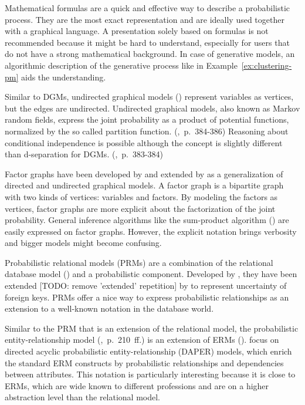 Mathematical formulas are a quick and effective way to describe a probabilistic process. They are the most exact representation and are ideally used together with a graphical language. A presentation solely based on formulas is not recommended because it might be hard to understand, especially for users that do not have a strong mathematical background. In case of generative models, an algorithmic description of the generative process like in Example~\ref{ex:clustering-pm} aids the understanding. 

Similar to DGMs, undirected graphical models (\cite{kindermann1980markov}) represent variables as vertices, but the edges are undirected. Undirected graphical models, also known as Markov random fields, express the joint probability as a product of potential functions, normalized by the so called partition function. (\cite{bishop2006pattern},~p.~384-386) Reasoning about conditional independence is possible although the concept is slightly different than d-separation for DGMs. (\cite{bishop2006pattern},~p.~383-384)

Factor graphs have been developed by \textcite{kschischang2001factor} and extended by \textcite{frey2002extending} as a generalization of directed and undirected graphical models. A factor graph is a bipartite graph with two kinds of vertices: variables and factors. By modeling the factors as vertices, factor graphs are more explicit about the factorization of the joint probability. General inference algorithms like the sum-product algorithm (\cite{pearl1988probabilistic}) are easily expressed on factor graphs. However, the explicit notation brings verbosity and bigger models might become confusing.

Probabilistic relational models (PRMs) are a combination of the relational database model (\cite{codd1970relational}) and a probabilistic component. Developed by \textcite{friedman1999learning}, they have been extended [TODO: remove 'extended' repetition] by \textcite{getoor2003learning} to represent uncertainty of foreign keys. PRMs offer a nice way to express probabilistic relationships as an extension to a well-known notation in the database world.

Similar to the PRM that is an extension of the relational model, the probabilistic entity-relationship model (\cite{heckerman2007probabilistic},~p.~210~ff.) is an extension of ERMs (\cite{chen1976entity}). \cite{heckerman2007probabilistic} focus on directed acyclic probabilistic entity-relationship (DAPER) models, which enrich the standard ERM constructs by probabilistic relationships and dependencies between attributes. This notation is particularly interesting because it is close to ERMs, which are wide known to different professions and are on a higher abstraction level than the relational model.


